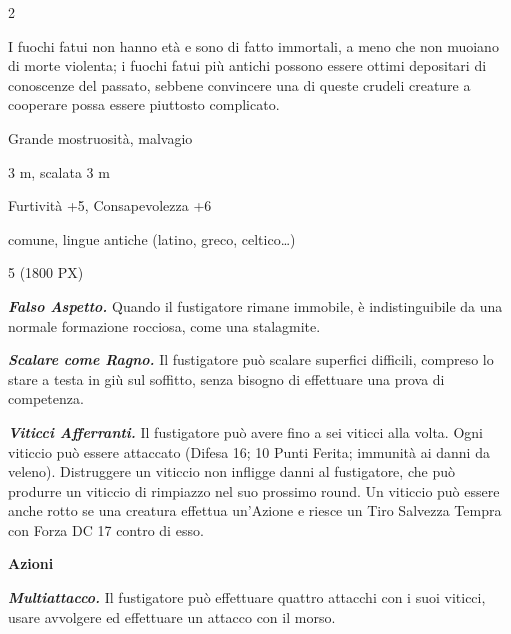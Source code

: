\begin{multicols}{2}
{I fuochi fatui non hanno età e sono di fatto immortali, a meno che non muoiano di morte violenta; i fuochi fatui più antichi possono essere ottimi depositari di conoscenze del passato, sebbene convincere una di queste crudeli creature a cooperare possa essere piuttosto complicato.

\begin{description}[noitemsep, topsep=0pt, parsep=0pt, partopsep=0pt, itemsep=1pt, leftmargin=2.35cm,  labelwidth=2.2cm, itemindent=0cm, listparindent=0pt] %
\setlength{\baselineskip}{10pt}
\item[\textbf{Taglia/Tipo}] Grande mostruosità, malvagio
\item[\textbf{Caratt.}] 
\item[\textbf{Punti Ferita}] 
\item[\textbf{Movimento}] 3 m, scalata 3 m
\item[\textbf{Tiri Salvez.}] 
\item[\textbf{Comp.}] Furtività +5, Consapevolezza +6
\item[\textbf{Sensi}] 
\item[\textbf{Linguaggi}] comune, lingue antiche (latino, greco, celtico…)
\item[\textbf{Sfida}] 5 (1800 PX)
\end{description}
\smallskip

\emph{\textbf{Falso Aspetto.}} Quando il fustigatore rimane immobile, è indistinguibile da una normale formazione rocciosa, come una stalagmite.

\emph{\textbf{Scalare come Ragno.}} Il fustigatore può scalare superfici difficili, compreso lo stare a testa in giù sul soffitto, senza bisogno di effettuare una prova di competenza.

\emph{\textbf{Viticci Afferranti.}} Il fustigatore può avere fino a sei viticci alla volta. Ogni viticcio può essere attaccato (Difesa 16; 10 Punti Ferita; immunità ai danni da veleno). Distruggere un viticcio non infligge danni al fustigatore, che può produrre un viticcio di rimpiazzo nel suo prossimo round. Un viticcio può essere anche rotto se una creatura effettua un'Azione e riesce un Tiro Salvezza Tempra con Forza DC 17 contro di esso.

\textbf{Azioni}

\emph{\textbf{Multiattacco.}} Il fustigatore può effettuare quattro attacchi con i suoi viticci, usare avvolgere ed effettuare un attacco con il morso.

}
\end{multicols}
